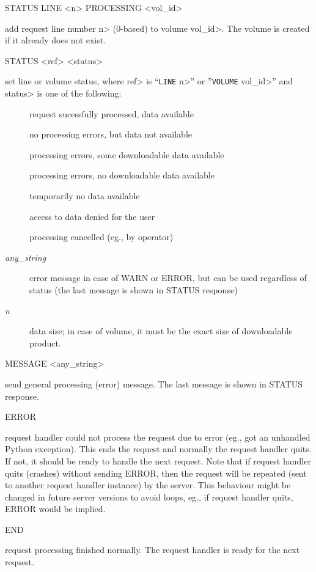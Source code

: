 \documentclass[11pt,a4paper,titlepage]{article}
\let\stditem\item
\begin{document}
\begin{interface}

\item STATUS LINE <n> PROCESSING <vol\_id>

add request line number \<n> (0-based) to volume \<vol_id>. The volume is
created if it already does not exist.

\item STATUS <ref> <status>

set line or volume status, where \<ref> is ``\texttt{LINE} \<n>'' or
''\texttt{VOLUME} \<vol_id>'' and \<status> is one of the following:
\begin{description}
\stditem[] request sucessfully processed, data available
\stditem[] no processing errors, but data not available
\stditem[] processing errors, some downloadable data available
\stditem[] processing errors, no downloadable data available
\stditem[] temporarily no data available
\stditem[] access to data denied for the user
\stditem[] processing cancelled (eg., by operator)
\stditem[ \textnormal{\emph{any\_string}}] error message in
    case of WARN or ERROR, but can be used regardless of status (the last
    message is shown in STATUS response)
\stditem[ \textnormal{\emph{n}}] data size; in case of volume,
    it must be the exact size of downloadable product.
\end{description}

\item MESSAGE <any_string>

send general processing (error) message. The last message is shown in
STATUS response.

\item ERROR

request handler could not process the request due to error (eg., got an
unhandled Python exception). This ends the request and normally the request
handler quits. If not, it should be ready to handle the next request. Note
that if request handler quits (crashes) without sending ERROR, then the
request will be repeated (sent to another request handler instance) by the
server. This behaviour might be changed in future server versions to avoid
loops, eg., if request handler quits, ERROR would be implied.

\item END

request processing finished normally. The request handler is ready for the
next request.

\end{interface}
\end{document}
